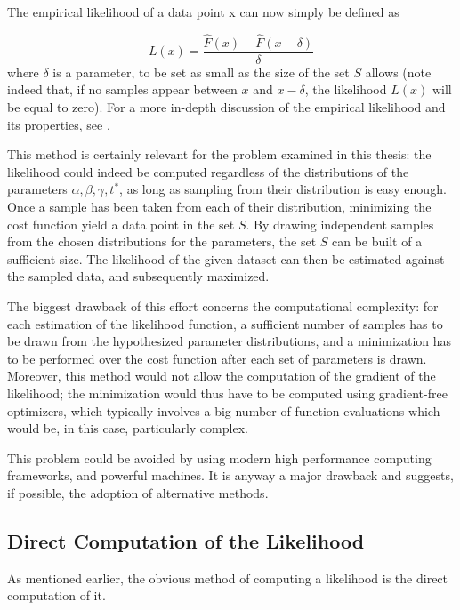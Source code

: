 The empirical likelihood of a data point x can now simply be defined as

\begin{equation}
  \label{eq:emp_lik}
  L(x) = \frac{\hat{F}(x) - \hat{F}(x - \delta)}{\delta}
\end{equation}
where \(\delta\) is a parameter,
to be set as small as the size of the set \(S\) allows
(note indeed that, if no samples appear between \(x\) and \(x - \delta\), the likelihood \(L(x)\) will be equal to zero).
For a more in-depth discussion of the empirical likelihood and its properties, see \textcite{annurev:/content/journals/10.1146/annurev-statistics-040720-024710}.

This method is certainly relevant for the problem examined in this thesis:
the likelihood could indeed be computed regardless of the distributions of the parameters \(\alpha, \beta, \gamma, t^*\),
as long as sampling from their distribution is easy enough.
Once a sample has been taken from each of their distribution,
minimizing the cost function yield a data point in the set \(S\).
By drawing independent samples from the chosen distributions for the parameters,
the set \(S\) can be built of a sufficient size.
The likelihood of the given dataset can then be estimated against the sampled data,
and subsequently maximized.

The biggest drawback of this effort concerns the computational complexity:
for each estimation of the likelihood function,
a sufficient number of samples has to be drawn from the hypothesized parameter distributions,
and a minimization has to be performed over the cost function after each set of parameters is drawn.
Moreover, this method would not allow the computation of the gradient of the likelihood;
the minimization would thus have to be computed using gradient-free optimizers,
which typically involves a big number of function evaluations \parencite{Larson_Menickelly_Wild_2019} which would be,
in this case, particularly complex.

This problem could be avoided by using modern high performance computing frameworks,
and powerful machines.
It is anyway a major drawback and suggests, if possible, the adoption of alternative methods.

\subsection{Direct Computation of the Likelihood}
\label{sec:lik_comp}

As mentioned earlier, the obvious method of computing a likelihood is the direct computation of it.

